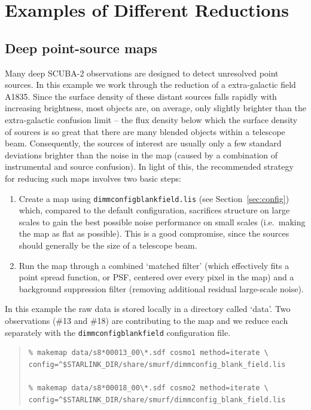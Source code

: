 \documentclass[twoside,11pt]{article}
\newcommand{\xlabel}[1]{}
\renewcommand{\_}{\texttt{\symbol{95}}}
\newenvironment{myquote}{\begin{quote}\begin{small}}{\end{small}\end{quote}}
\begin{document}
\clearpage
\section{\xlabel{Examples}Examples of Different Reductions}
\label{sec:eg}

\subsection{\xlabel{Cosmology}Deep point-source maps}
\label{sec:cosmology}

Many deep SCUBA-2 observations are designed to detect unresolved point sources. In this example we work through the reduction of a extra-galactic field A1835.  Since the surface density of these distant sources falls rapidly with increasing brightness, most objects are, on average, only slightly brighter than the extra-galactic confusion limit -- the flux density below which the surface density of sources is so great that there are many blended objects within a telescope beam. Consequently, the sources of interest are usually only a few standard deviations brighter than the noise in the map (caused by a combination of instrumental and source confusion). In light of this, the recommended strategy for reducing such maps involves two basic steps:

\begin{enumerate}

\item Create a map using \texttt{dimmconfig\_blank\_field.lis} (see
  Section~\ref{sec:config}) which, compared to the default
  configuration, sacrifices structure on large scales to gain the best
  possible noise performance on small scales (i.e.~making the map as
  flat as possible). This is a good compromise, since the sources
  should generally be the size of a telescope beam.

\item Run the map through a combined `matched filter' (which
  effectively fits a point spread function, or PSF, centered over
  every pixel in the map) and a background suppression filter
  (removing additional residual large-scale noise).
\end{enumerate}

In this example the raw data is stored locally in a directory called `data'. Two observations (\#13 and \#18) are contributing to the map and we reduce each separately with the \texttt{dimmconfig\_blank\_field} configuration file.

\begin{myquote}
\begin{verbatim}
% makemap data/s8*00013_00\*.sdf cosmo1 method=iterate \
config=^$STARLINK_DIR/share/smurf/dimmconfig_blank_field.lis

% makemap data/s8*00018_00\*.sdf cosmo2 method=iterate \
config=^$STARLINK_DIR/share/smurf/dimmconfig_blank_field.lis
\end{verbatim}
\end{myquote}
\end{document}
